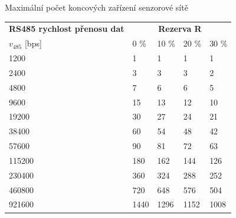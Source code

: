 \documentclass{beamer}
\begin{document}
\begin{frame} {Maximální počet koncových zařízení senzorové sítě}




	\begin{longtable} {|l|llll|}
			\hline
			\textbf{RS485 rychlost přenosu dat} &       \multicolumn{4}{c|}{\textbf{Rezerva R}}	  	    \\
			$v_{485}$ {[bps]}  &	0 \%	&	10 \%	&	20 \%	&	30 \%  \\ \hline
		
			1200~~~ &    1	&    1	&    1	&    1 \\
			2400~~~ &    3	&    3	&    3	&    2 \\
			4800~~~ &    7	&    6	&    6	&    5 \\
			9600~~~ &   15	&   13	&   12	&   10 \\
			19200~~~ &   30	&   27	&   24	&   21 \\
			38400~~~ &   60	&   54	&   48	&   42 \\
			57600~~~ &   90	&   81	&   72	&   63 \\
			115200~~~ &  180	&  162	&  144	&  126 \\
			230400~~~ &  360	&  324	&  288	&  252 \\
			460800~~~ &  720	&  648	&  576	&  504 \\
			921600~~~ & 1440	& 1296	& 1152	& 1008 \\
			\hline
		
		\end{longtable}
\end{frame}
\end{document}
